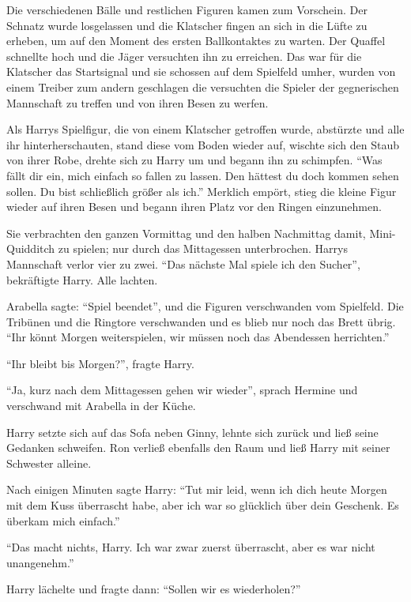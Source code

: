 Die verschiedenen Bälle und restlichen Figuren kamen zum Vorschein. Der Schnatz wurde losgelassen und die Klatscher fingen an sich in die Lüfte zu erheben, um auf den Moment des ersten Ballkontaktes zu warten. Der Quaffel schnellte hoch und die Jäger versuchten ihn zu erreichen. Das war für die Klatscher das Startsignal und sie schossen auf dem Spielfeld umher, wurden von einem Treiber zum andern geschlagen die versuchten die Spieler der gegnerischen Mannschaft zu treffen und von ihren Besen zu werfen.

Als Harrys Spielfigur, die von einem Klatscher getroffen wurde, abstürzte und alle ihr hinterherschauten, stand diese vom Boden wieder auf, wischte sich den Staub von ihrer Robe, drehte sich zu Harry um und begann ihn zu schimpfen. \enquote{Was fällt dir ein, mich einfach so fallen zu lassen. Den hättest du doch kommen sehen sollen. Du bist schließlich größer als ich.} Merklich empört, stieg die kleine Figur wieder auf ihren Besen und begann ihren Platz vor den Ringen einzunehmen.

Sie verbrachten den ganzen Vormittag und den halben Nachmittag damit, Mini-Quidditch zu spielen; nur durch das Mittagessen unterbrochen. Harrys Mannschaft verlor vier zu zwei. \enquote{Das nächste Mal spiele ich den Sucher}, bekräftigte Harry. Alle lachten.

Arabella sagte: \enquote{Spiel beendet}, und die Figuren verschwanden vom Spielfeld. Die Tribünen und die Ringtore verschwanden und es blieb nur noch das Brett übrig. \enquote{Ihr könnt Morgen weiterspielen, wir müssen noch das Abendessen herrichten.}

\enquote{Ihr bleibt bis Morgen?}, fragte Harry.

\enquote{Ja, kurz nach dem Mittagessen gehen wir wieder}, sprach Hermine und verschwand mit Arabella in der Küche.

Harry setzte sich auf das Sofa neben Ginny, lehnte sich zurück und ließ seine Gedanken schweifen. Ron verließ ebenfalls den Raum und ließ Harry mit seiner Schwester alleine.

Nach einigen Minuten sagte Harry: \enquote{Tut mir leid, wenn ich dich heute Morgen mit dem Kuss überrascht habe, aber ich war so glücklich über dein Geschenk. Es überkam mich einfach.}

\enquote{Das macht nichts, Harry. Ich war zwar zuerst überrascht, aber es war nicht unangenehm.}

Harry lächelte und fragte dann: \enquote{Sollen wir es wiederholen?}

